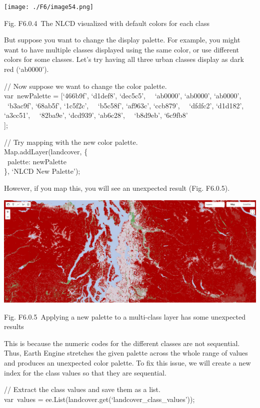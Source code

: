 \documentclass[
  letterpaper,
  DIV=11,
  numbers=noendperiod]{scrreprt}
\begin{document}
\texttt{[image: ./F6/image54.png]}

Fig. F6.0.4~The NLCD visualized with default colors for each class

But suppose you want to change the display palette. For example, you
might want to have multiple classes displayed using the same color, or
use different colors for some classes. Let's try having all three urban
classes display as dark red (`ab0000').

// Now suppose we want to change the color palette.\\
var~newPalette = {[}`466b9f', `d1def8', `dec5c5',~ ~`ab0000', `ab0000',
`ab0000',~ ~`b3ac9f', `68ab5f', `1c5f2c',~ ~`b5c58f', `af963c',
`ccb879',~ ~`dfdfc2', `d1d182', `a3cc51',~ ~`82ba9e', `dcd939',
`ab6c28',~ ~`b8d9eb', `6c9fb8'\\
{]};

// Try mapping with the new color palette.\\
Map.addLayer(landcover, \{\\
\hspace*{0.333em} ~palette: newPalette\\
\}, `NLCD New Palette');

However, if you map this, you will see an unexpected result (Fig.
F6.0.5).

\includegraphics{./F6/image64.png}

Fig. F6.0.5~Applying a new palette to a multi-class layer has some
unexpected results

This is because the numeric codes for the different classes are not
sequential. Thus, Earth Engine stretches the given palette across the
whole range of values and produces an unexpected color palette. To fix
this issue, we will create a new index for the class values so that they
are sequential.

// Extract the class values and save them as a list.\\
var~values = ee.List(landcover.get(`landcover\_class\_values'));
\end{document}
